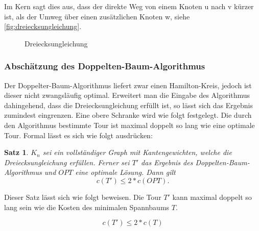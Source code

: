 \documentclass{article}
\newtheorem{mysat}{Satz}
\begin{document}
Im Kern sagt dies aus, dass der direkte Weg von einem Knoten u nach v kürzer ist, als der Umweg über einen zusätzlichen Knoten w, siehe \autoref{fig:dreiecksungleichung}.

\begin{figure}[H]
\centering
{}
\caption{Dreiecksungleichung}
\label{fig:dreiecksungleichung}
\end{figure}



\subsubsection{Abschätzung des Doppelten-Baum-Algorithmus}
Der Doppelter-Baum-Algorithmus liefert zwar einen Hamilton-Kreis, jedoch ist dieser nicht zwangsläufig optimal. Erweitert man die Eingabe des Algorithmus dahingehend, dass die Dreiecksungleichung erfüllt ist, so lässt sich das Ergebnis zumindest eingrenzen. Eine obere Schranke wird wie folgt festgelegt. Die durch den Algorithmus bestimmte Tour ist maximal doppelt so lang wie eine optimale Tour. Formal lässt es sich wie folgt ausdrücken:

\begin{mysat}\label{thm:doppelterbaum-obere-grenze}
$K_n$ sei ein vollständiger Graph mit Kantengewichten, welche die Dreiecksungleichung erfüllen. Ferner sei $T'$ das Ergebnis des Doppelten-Baum-Algorithmus und $OPT$ eine optimale Lösung. Dann gilt
\begin{equation}
c(T') \leq 2 * c(OPT).
\label{eq:test}
\end{equation}
\end{mysat}

Dieser Satz lässt sich wie folgt beweisen. Die Tour $T'$ kann maximal doppelt so lang sein wie die Kosten des minimalen Spannbaums $T$.

\begin{equation}
c(T') \leq 2 * c(T)
\end{equation}
\end{document}
